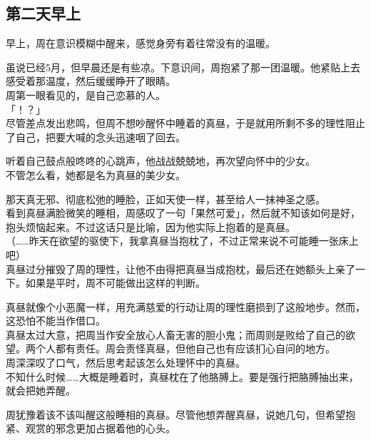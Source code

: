 \subsection{第二天早上}

早上，周在意识模糊中醒来，感觉身旁有着往常没有的温暖。

虽说已经5月，但早晨还是有些凉。下意识间，周抱紧了那一团温暖。他紧贴上去感受着那温度，然后缓缓睁开了眼睛。\\

周第一眼看见的，是自己恋慕的人。\\

「！？」\\

尽管差点发出悲鸣，但周不想吵醒怀中睡着的真昼，于是就用所剩不多的理性阻止了自己，把要大喊的念头迅速咽了回去。

听着自己鼓点般咚咚的心跳声，他战战兢兢地，再次望向怀中的少女。\\

不管怎么看，她都是名为真昼的美少女。

那天真无邪、彻底松弛的睡脸，正如天使一样，甚至给人一抹神圣之感。\\

看到真昼满脸微笑的睡相，周感叹了一句「果然可爱」，然后就不知该如何是好，抱头烦恼起来。不过这话只是比喻，因为他实际上抱着的是真昼。\\

（……昨天在欲望的驱使下，我拿真昼当抱枕了，不过正常来说不可能睡一张床上吧）\\

真昼过分摧毁了周的理性，让他不由得把真昼当成抱枕，最后还在她额头上亲了一下。如果是平时，周不可能做出这样的判断。

真昼就像个小恶魔一样，用充满慈爱的行动让周的理性磨损到了这般地步。然而，这恐怕不能当作借口。\\

真昼太过大意，把周当作安全放心人畜无害的胆小鬼；而周则是败给了自己的欲望。两个人都有责任。周会责怪真昼，但他自己也有应该扪心自问的地方。\\

周深深叹了口气，然后思考起该怎么处理怀中的真昼。\\

不知什么时候……大概是睡着时，真昼枕在了他胳膊上。要是强行把胳膊抽出来，就会把她弄醒。

周犹豫着该不该叫醒这般睡相的真昼。尽管他想弄醒真昼，说她几句，但希望抱紧、观赏的邪念更加占据着他的心头。\\


